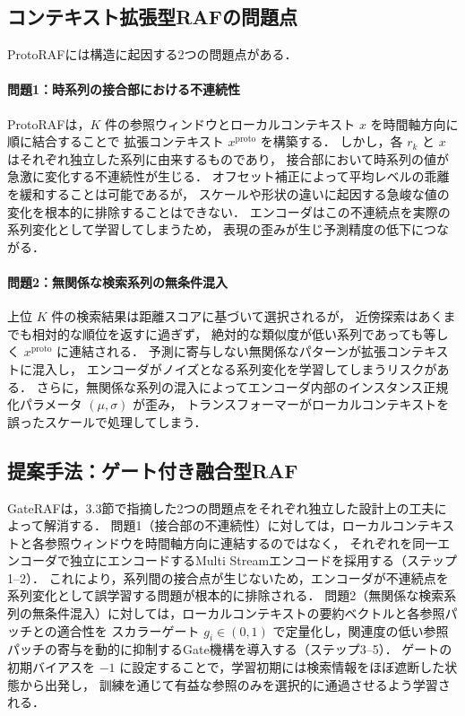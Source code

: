 \documentclass[twocolumn, lastpage]{jarticle}
\begin{document}
\subsection{コンテキスト拡張型RAFの問題点}
ProtoRAFには構造に起因する2つの問題点がある．

    \paragraph{問題1：時系列の接合部における不連続性}
    ProtoRAFは，$K$ 件の参照ウィンドウとローカルコンテキスト $x$ を時間軸方向に順に結合することで
    拡張コンテキスト $x^{\mathrm{proto}}$ を構築する．
    しかし，各 $r_k$ と $x$ はそれぞれ独立した系列に由来するものであり，
    接合部において時系列の値が急激に変化する不連続性が生じる．
    オフセット補正によって平均レベルの乖離を緩和することは可能であるが，
    スケールや形状の違いに起因する急峻な値の変化を根本的に排除することはできない．
    エンコーダはこの不連続点を実際の系列変化として学習してしまうため，
    表現の歪みが生じ予測精度の低下につながる．

    \paragraph{問題2：無関係な検索系列の無条件混入}
    上位 $K$ 件の検索結果は距離スコアに基づいて選択されるが，
    近傍探索はあくまでも相対的な順位を返すに過ぎず，
    絶対的な類似度が低い系列であっても等しく $x^{\mathrm{proto}}$ に連結される．
    予測に寄与しない無関係なパターンが拡張コンテキストに混入し，
    エンコーダがノイズとなる系列変化を学習してしまうリスクがある．
    さらに，無関係な系列の混入によってエンコーダ内部のインスタンス正規化パラメータ $(\mu, \sigma)$ が歪み，
    トランスフォーマーがローカルコンテキストを誤ったスケールで処理してしまう．


\subsection{提案手法：ゲート付き融合型RAF}
GateRAFは，3.3節で指摘した2つの問題点をそれぞれ独立した設計上の工夫によって解消する．
問題1（接合部の不連続性）に対しては，ローカルコンテキストと各参照ウィンドウを時間軸方向に連結するのではなく，
それぞれを同一エンコーダで独立にエンコードするMulti Streamエンコードを採用する（ステップ1--2）．
これにより，系列間の接合点が生じないため，エンコーダが不連続点を系列変化として誤学習する問題が根本的に排除される．
問題2（無関係な検索系列の無条件混入）に対しては，ローカルコンテキストの要約ベクトルと各参照パッチとの適合性を
スカラーゲート $g_i \in (0,1)$ で定量化し，関連度の低い参照パッチの寄与を動的に抑制するGate機構を導入する（ステップ3--5）．
ゲートの初期バイアスを $-1$ に設定することで，学習初期には検索情報をほぼ遮断した状態から出発し，
訓練を通じて有益な参照のみを選択的に通過させるよう学習される．
\end{document}
